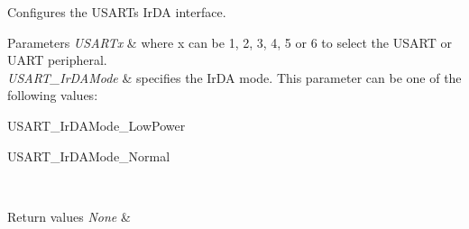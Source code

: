 Configures the U\+S\+A\+RT\textquotesingle{}s Ir\+DA interface. 


\begin{DoxyParams}{Parameters}
{\em U\+S\+A\+R\+Tx} & where x can be 1, 2, 3, 4, 5 or 6 to select the U\+S\+A\+RT or U\+A\+RT peripheral. \\
\hline
{\em U\+S\+A\+R\+T\+\_\+\+Ir\+D\+A\+Mode} & specifies the Ir\+DA mode. This parameter can be one of the following values\+: \begin{DoxyItemize}
\item U\+S\+A\+R\+T\+\_\+\+Ir\+D\+A\+Mode\+\_\+\+Low\+Power \item U\+S\+A\+R\+T\+\_\+\+Ir\+D\+A\+Mode\+\_\+\+Normal \end{DoxyItemize}
\\
\hline
\end{DoxyParams}

\begin{DoxyRetVals}{Return values}
{\em None} & \\
\hline
\end{DoxyRetVals}
